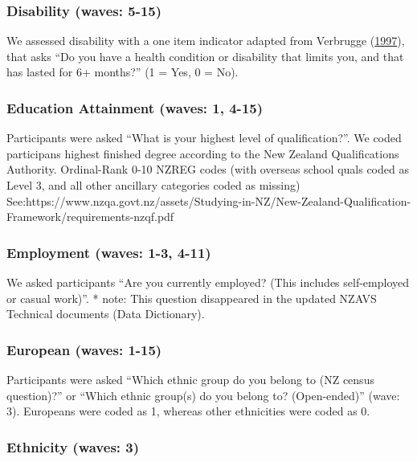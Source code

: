\documentclass[
  singlecolumn]{report}
\begin{document}
\hypertarget{disability-waves-5-15}{%
\subsubsection{Disability (waves: 5-15)}\label{disability-waves-5-15}}

We assessed disability with a one item indicator adapted from Verbrugge
(\protect\hyperlink{ref-verbrugge1997}{1997}), that asks ``Do you have a
health condition or disability that limits you, and that has lasted for
6+ months?'' (1 = Yes, 0 = No).

\hypertarget{education-attainment-waves-1-4-15}{%
\subsubsection{Education Attainment (waves: 1,
4-15)}\label{education-attainment-waves-1-4-15}}

Participants were asked ``What is your highest level of
qualification?''. We coded participans highest finished degree according
to the New Zealand Qualifications Authority. Ordinal-Rank 0-10 NZREG
codes (with overseas school quals coded as Level 3, and all other
ancillary categories coded as missing)
See:https://www.nzqa.govt.nz/assets/Studying-in-NZ/New-Zealand-Qualification-Framework/requirements-nzqf.pdf

\hypertarget{employment-waves-1-3-4-11}{%
\subsubsection{Employment (waves: 1-3,
4-11)}\label{employment-waves-1-3-4-11}}

We asked participants ``Are you currently employed? (This includes
self-employed or casual work)''. * note: This question disappeared in
the updated NZAVS Technical documents (Data Dictionary).

\hypertarget{european-waves-1-15}{%
\subsubsection{European (waves: 1-15)}\label{european-waves-1-15}}

Participants were asked ``Which ethnic group do you belong to (NZ census
question)?'' or ``Which ethnic group(s) do you belong to? (Open-ended)''
(wave: 3). Europeans were coded as 1, whereas other ethnicities were
coded as 0.

\hypertarget{ethnicity-waves-3}{%
\subsubsection{Ethnicity (waves: 3)}\label{ethnicity-waves-3}}
\end{document}
